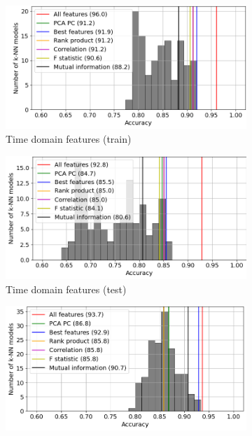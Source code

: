 \begin{figure}[h]
    \centering
    \begin{subfigure}[b]{0.48\textwidth}
        \includegraphics[width=\textwidth]{assets/results/feature-combinations/model-distr-fsel-k5-f3-TD-train.png}
        \caption{Time domain features (train)}
    \end{subfigure}
    \hfill
    \begin{subfigure}[b]{0.48\textwidth}
        \includegraphics[width=\textwidth]{assets/results/feature-combinations/model-distr-fsel-k5-f3-TD-test.png}
        \caption{Time domain features (test)}
    \end{subfigure}
    \hfill
    \begin{subfigure}[b]{0.48\textwidth}
        \includegraphics[width=\textwidth]{assets/results/feature-combinations/model-distr-fsel-k5-f3-FD-train.png}

\end{subfigure}
\end{figure}

